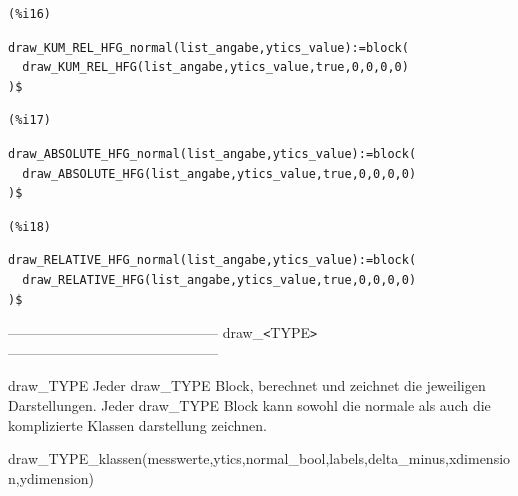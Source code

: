 \documentclass{article}
\begin{document}
\noindent
\begin{minipage}[t]{8ex}{\color{red}\bf
\begin{verbatim}
(%i16) 
\end{verbatim}}
\end{minipage}
\begin{minipage}[t]{\textwidth}{\color{blue}
\begin{verbatim}
draw_KUM_REL_HFG_normal(list_angabe,ytics_value):=block(
  draw_KUM_REL_HFG(list_angabe,ytics_value,true,0,0,0,0)
)$
\end{verbatim}}
\end{minipage}


\noindent
\begin{minipage}[t]{8ex}{\color{red}\bf
\begin{verbatim}
(%i17) 
\end{verbatim}}
\end{minipage}
\begin{minipage}[t]{\textwidth}{\color{blue}
\begin{verbatim}
draw_ABSOLUTE_HFG_normal(list_angabe,ytics_value):=block(
  draw_ABSOLUTE_HFG(list_angabe,ytics_value,true,0,0,0,0)
)$
\end{verbatim}}
\end{minipage}


\noindent
\begin{minipage}[t]{8ex}{\color{red}\bf
\begin{verbatim}
(%i18) 
\end{verbatim}}
\end{minipage}
\begin{minipage}[t]{\textwidth}{\color{blue}
\begin{verbatim}
draw_RELATIVE_HFG_normal(list_angabe,ytics_value):=block(
  draw_RELATIVE_HFG(list_angabe,ytics_value,true,0,0,0,0)
)$
\end{verbatim}}
\end{minipage}

--------------------------------------------- draw\_\verb|<|TYPE\verb|>| ---------------------------------------------

draw\_TYPE
    Jeder draw\_TYPE Block, berechnet und zeichnet die jeweiligen Darstellungen. 
    Jeder draw\_TYPE Block kann sowohl die normale als auch die komplizierte Klassen darstellung zeichnen.

draw\_TYPE\_klassen(messwerte,ytics,normal\_bool,labels,delta\_minus,xdimension,ydimension)
\end{document}
